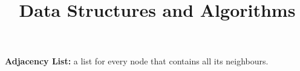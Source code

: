 \message{ !name(main.tex)}\documentclass{tufte-handout}
\title{Data Structures and Algorithms}
\begin{document}
\textbf{Adjacency List:} a list for every node that contains all its neighbours. 

\end{document}
